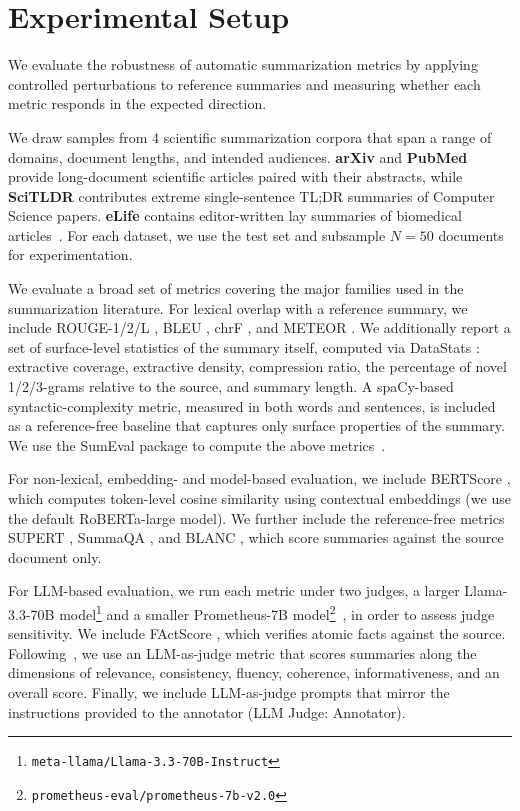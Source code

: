 \section{Experimental Setup \hyperref[chsevenrq1]{\chsevenrqone}}\label{sec:ch-7-experimental-setup}

We evaluate the robustness of automatic summarization metrics by
applying controlled perturbations to reference summaries and measuring
whether each metric responds in the expected direction. 

We draw samples from 4 scientific summarization corpora that span
a range of domains, document lengths, and intended audiences.
\textbf{arXiv} and \textbf{PubMed} \cite{cohan2018discourse} provide
long-document scientific articles paired with their abstracts, while
\textbf{SciTLDR} \cite{cachola2020tldr} contributes extreme
single-sentence TL;DR summaries of Computer Science papers. \textbf{eLife} contains editor-written lay summaries of biomedical articles~\cite{goldsack2022making}.
For each dataset, we use the test set and subsample $N{=}50$ documents for experimentation.

We evaluate a broad set of metrics covering the major families used in
the summarization literature. For lexical overlap with a reference
summary, we include ROUGE-1/2/L \cite{lin2004rouge},
BLEU \cite{papineni2002bleu}, chrF \cite{popovic2017chrf}, and
METEOR \cite{banerjee2005meteor}. We additionally report a set of
surface-level statistics of the summary itself, computed via
DataStats \cite{grusky2018newsroom}: extractive coverage, extractive
density, compression ratio, the percentage of novel 1/2/3-grams
relative to the source, and summary length. A spaCy-based
\cite{honnibal2020spacy} syntactic-complexity metric, measured in
both words and sentences, is included as a reference-free baseline
that captures only surface properties of the summary. We use the
SumEval package to compute the above metrics~\cite{fabbri2021summeval}.
 
For non-lexical, embedding- and model-based evaluation, we include
BERTScore \cite{zhang2020bertscore}, which computes token-level
cosine similarity using contextual embeddings (we use the default
RoBERTa-large model). We further include the reference-free metrics
SUPERT \cite{gao2020supert}, SummaQA \cite{scialom2019summa}, and
BLANC \cite{vasilyev2020blanc}, which score summaries against the
source document only.
 
For LLM-based evaluation, we run each metric under two judges, a
larger Llama-3.3-70B model\footnote{\texttt{meta-llama/Llama-3.3-70B-Instruct}} and a smaller Prometheus-7B
model\footnote{\texttt{prometheus-eval/prometheus-7b-v2.0}}~\cite{kim2023prometheus, grattafiori2024llama3}, in order to assess judge sensitivity.
We include FActScore \cite{min2023factscore}, which verifies atomic
facts against the source. Following~\textcite{liu2023geval}, we use an
LLM-as-judge metric \cite{zheng2023judging} that scores summaries
along the dimensions of relevance, consistency, fluency, coherence,
informativeness, and an overall score. Finally, we include
LLM-as-judge prompts that mirror the instructions provided to the
annotator (LLM Judge: Annotator). 

